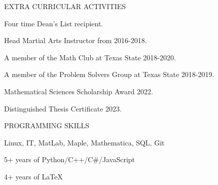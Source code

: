 \documentclass{resume} %
\begin{document}
\begin{rSection}{EXTRA CURRICULAR ACTIVITIES}

\begin{rSubsection}{}{}{}{} 
\item Four time Dean's List recipient.
\item Head Martial Arts Instructor from 2016-2018.
\item A member of the Math Club at Texas State 2018-2020.
\item A member of the Problem Solvers Group at Texas State 2018-2019.
\item Mathematical Sciences Scholarship Award 2022.
\item Distinguished Thesis Certificate 2023.
\end{rSubsection}

\end{rSection}



\begin{rSection}{PROGRAMMING SKILLS} \itemsep -3pt  

\item Linux, IT, MatLab, Maple, Mathematica, SQL, Git
\item 5+ years of Python/C++/C\#/JavaScript
\item 4+ years of \LaTeX

\end{rSection} 
\end{document}
